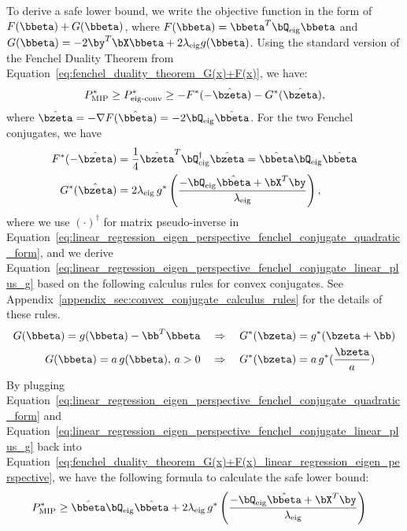 To derive a safe lower bound, we write the objective function in the form of $F(\bbeta)+G(\bbeta)$, where $F(\bbeta)= \bbeta^T \bQ_{\text{eig}} \bbeta$ and $G(\bbeta) = -2\by^T \bX \bbeta + 2 \lambda_{\text{eig}} g(\bbeta)$.
Using the standard version of the Fenchel Duality Theorem from Equation~\eqref{eq:fenchel_duality_theorem_G(x)+F(x)}, we have:
\begin{align}
    \label{eq:fenchel_duality_theorem_G(x)+F(x)_linear_regression_eigen_perspective}
    P_{\text{MIP}}^* \geq P_{\text{eig-conv}}^* \geq - F^*(-\hat{\bzeta}) - G^*(\hat{\bzeta}),
\end{align}
where $\hat{\bzeta} = -\nabla F(\hat{\bbeta}) = -2\bQ_{\text{eig}} \hat{\bbeta}$.
For the two Fenchel conjugates, we have
\begin{align}
    F^*(-\hat{\bzeta}) &= \frac{1}{4} \hat{\bzeta}^T \bQ_{\text{eig}}^{\dagger} \hat{\bzeta} = \hat{\bbeta} \bQ_{\text{eig}} \hat{\bbeta} \label{eq:linear_regression_eigen_perspective_fenchel_conjugate_quadratic_form} \\
    G^*(\hat{\bzeta}) &= 2\lambda_{\text{eig}} \, g^* \left(\frac{-\bQ_{\text{eig}}\hat{\bbeta} +  \bX^T \by}{\lambda_{\text{eig}}} \right), \label{eq:linear_regression_eigen_perspective_fenchel_conjugate_linear_plus_g}
\end{align}
where we use $(\cdot)^{\dagger}$ for matrix pseudo-inverse in Equation~\eqref{eq:linear_regression_eigen_perspective_fenchel_conjugate_quadratic_form}, and we derive Equation~\eqref{eq:linear_regression_eigen_perspective_fenchel_conjugate_linear_plus_g} based on the following calculus rules for convex conjugates.
See Appendix~\ref{appendix_sec:convex_conjugate_calculus_rules} for the details of these rules.
\begin{align}
    G(\bbeta) = g(\bbeta) - \bb^T \bbeta \quad & \Rightarrow \quad G^*(\bzeta) = g^*(\bzeta + \bb) \nonumber \\
    G(\bbeta) = a \, g(\bbeta), \, a>0 \quad & \Rightarrow \quad G^*(\bzeta) = a\, g^*(\frac{\bzeta}{a}) \nonumber
\end{align}
By plugging Equation~\eqref{eq:linear_regression_eigen_perspective_fenchel_conjugate_quadratic_form} and Equation~\eqref{eq:linear_regression_eigen_perspective_fenchel_conjugate_linear_plus_g} back into Equation~\eqref{eq:fenchel_duality_theorem_G(x)+F(x)_linear_regression_eigen_perspective}, we have the following formula to calculate the safe lower bound:
\begin{align}
    \label{eq:linear_regression_eigen_perspective_lower_bound_formula}
    P_{\text{MIP}}^* & \geq \hat{\bbeta} \bQ_{\text{eig}} \hat{\bbeta} + 2\lambda_{\text{eig}} \, g^* \left(\frac{-\bQ_{\text{eig}}\hat{\bbeta} +  \bX^T \by}{\lambda_{\text{eig}}}\right)
\end{align}
